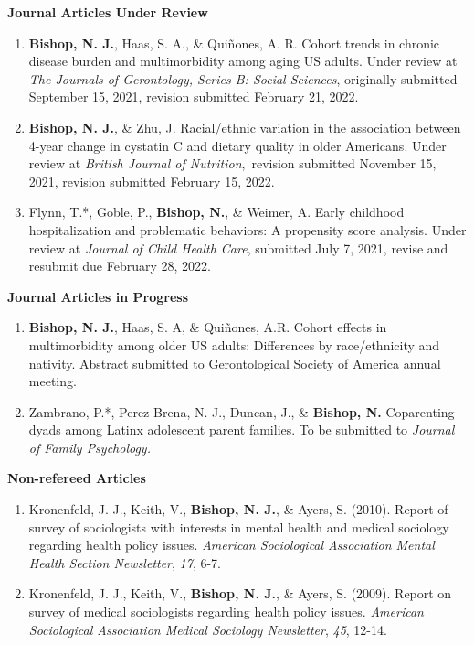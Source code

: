 \documentclass[
]{article}
\begin{document}
\textbf{Journal Articles Under Review}

\begin{enumerate}
\def\labelenumi{\arabic{enumi}.}
\item
  \textbf{Bishop, N. J.}, Haas, S. A., \& Quiñones, A. R. Cohort trends
  in chronic disease burden and multimorbidity among aging US adults.
  Under review at \emph{The Journals of Gerontology, Series B: Social
  Sciences}, originally submitted September 15, 2021, revision submitted
  February 21, 2022.
\item
  \textbf{Bishop, N. J.}, \& Zhu, J. Racial/ethnic variation in the
  association between 4-year change in cystatin C and dietary quality in
  older Americans. Under review at \emph{British Journal of
  Nutrition},~revision submitted November 15, 2021, revision submitted
  February 15, 2022.
\item
  Flynn, T.*, Goble, P., \textbf{Bishop, N.}, \& Weimer, A. Early
  childhood hospitalization and problematic behaviors: A propensity
  score analysis. Under review at \emph{Journal of Child Health Care},
  submitted July 7, 2021, revise and resubmit due February 28, 2022.
\end{enumerate}

\textbf{Journal Articles in Progress}

\begin{enumerate}
\def\labelenumi{\arabic{enumi}.}
\item
  \textbf{Bishop, N. J.}, Haas, S. A, \& Quiñones, A.R. Cohort effects
  in multimorbidity among older US adults: Differences by race/ethnicity
  and nativity. Abstract submitted to Gerontological Society of America
  annual meeting.
\item
  Zambrano, P.*, Perez-Brena, N. J., Duncan, J., \& \textbf{Bishop, N.}
  Coparenting dyads among Latinx adolescent parent families. To be
  submitted to \emph{Journal of Family Psychology.}
\end{enumerate}

\textbf{Non-refereed Articles}

\begin{enumerate}
\def\labelenumi{\arabic{enumi}.}
\item
  Kronenfeld, J. J., Keith, V., \textbf{Bishop, N. J.}, \& Ayers, S.
  (2010). Report of survey of sociologists with interests in mental
  health and medical sociology regarding health policy issues.
  \emph{American Sociological Association Mental Health Section
  Newsletter}, \emph{17}, 6-7.
\item
  Kronenfeld, J. J., Keith, V., \textbf{Bishop, N. J.}, \& Ayers, S.
  (2009). Report on survey of medical sociologists regarding health
  policy issues. \emph{American Sociological Association Medical
  Sociology Newsletter}, \emph{45}, 12-14.
\end{enumerate}
\end{document}
